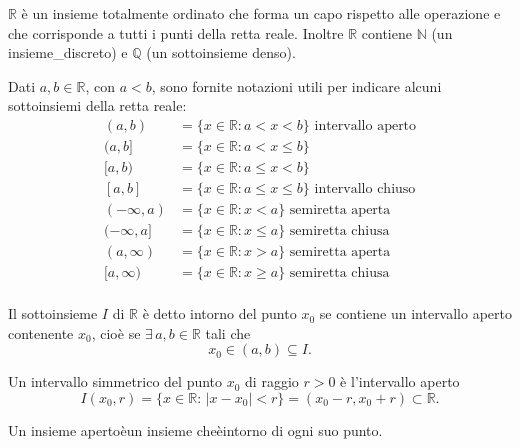 $\mathbb{R}$ è un insieme totalmente ordinato che forma un capo rispetto alle operazione e che corrisponde a tutti i punti della retta reale. Inoltre $\mathbb{R}$ contiene $\mathbb{N}$ (un \gls{insieme_discreto}) e $\mathbb{Q}$ (un sottoinsieme denso).

Dati $a,b\in\mathbb{R}$, con $a<b$, sono fornite notazioni utili per indicare alcuni sottoinsiemi della retta reale:
\begin{align*}
    (a,b) &= \{x\in\mathbb{R}:a<x<b\}\text{ intervallo aperto}\\
    (a,b] &= \{x\in\mathbb{R}:a<x\leq b\}\\
    [a,b) &= \{x\in\mathbb{R}:a\leq x<b\}\\
    [a, b] &= \{x\in\mathbb{R}:a\leq x\leq b\}\text{ intervallo chiuso}\\
    (-\infty,a) &= \{x\in\mathbb{R}:x<a\}\text{ semiretta aperta}\\
    (-\infty,a] &= \{x\in\mathbb{R}:x\leq a\}\text{ semiretta chiusa}\\
    (a, \infty) &= \{x\in\mathbb{R}:x>a\}\text{ semiretta aperta}\\
    [a, \infty) &= \{x\in\mathbb{R}:x\geq a\}\text{ semiretta chiusa}\\
\end{align*}

\begin{definition}\label{def:intorno}
    Il sottoinsieme $I$ di $\mathbb{R}$ è detto intorno del punto $x_0$ se contiene un intervallo aperto contenente $x_0$, cioè se $\exists\, a,b\in\mathbb{R}$ tali che
    \begin{equation*}
        x_0\in(a,b)\subseteq I.
    \end{equation*}
\end{definition}

\begin{definition}\label{def:intorno_simmetrico}
    Un intervallo simmetrico del punto $x_0$ di raggio $r>0$ è l'intervallo aperto
    \begin{equation}\label{eq:intorno_simmetrico}
        I(x_0,r)=\{x\in\mathbb R\colon\,|x-x_0|<r\}=(x_0 - r, x_0 + r)\subset\mathbb R.
    \end{equation}
\end{definition}

\begin{definition}
    Un insieme apertoèun insieme cheèintorno di ogni suo punto.
\end{definition}

